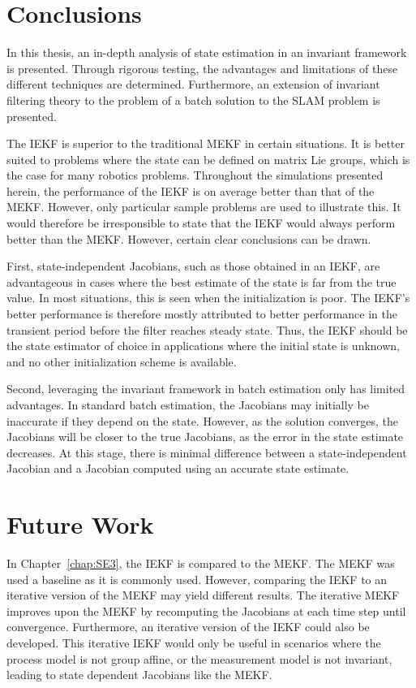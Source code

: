\section{Conclusions}

In this thesis, an in-depth analysis of state estimation in an invariant framework is presented. Through rigorous testing, the advantages and limitations of these different techniques are determined. Furthermore, an extension of invariant filtering theory to the problem of a batch solution to the SLAM problem is presented.  

The IEKF is superior to the traditional MEKF in certain situations. It is better suited to problems where the state can be defined on matrix Lie groups, which is the case for many robotics problems. Throughout the simulations presented herein, the performance of the IEKF is on average better than that of the MEKF. However, only particular sample problems are used to illustrate this. It would therefore be irresponsible to state that the IEKF would always perform better than the MEKF. However, certain clear conclusions can be drawn.

First, state-independent Jacobians, such as those obtained in an IEKF, are advantageous in cases where the best estimate of the state is far from the true value. In most situations, this is seen when the initialization is poor. The IEKF's better performance is therefore mostly attributed to better performance in the transient period before the filter reaches steady state. Thus, the IEKF should be the state estimator of choice in applications where the initial state is unknown, and no other initialization scheme is available. 

Second, leveraging the invariant framework in batch estimation only has limited advantages. In standard batch estimation, the Jacobians may initially be inaccurate if they depend on the state. However, as the solution converges, the Jacobians will be closer to the true Jacobians, as the error in the state estimate decreases. At this stage, there is minimal difference between a state-independent Jacobian and a Jacobian computed using an accurate state estimate. 

\section{Future Work}

In Chapter~\ref{chap:SE3}, the IEKF is compared to the MEKF. The MEKF was used a baseline as it is commonly used. However, comparing the IEKF to an iterative version of the MEKF may yield different results. The iterative MEKF improves upon the MEKF by recomputing the Jacobians at each time step until convergence. Furthermore, an iterative version of the IEKF could also be developed. This iterative IEKF would only be useful in scenarios where the process model is not group affine, or the measurement model is not invariant, leading to state dependent Jacobians like the MEKF. 


